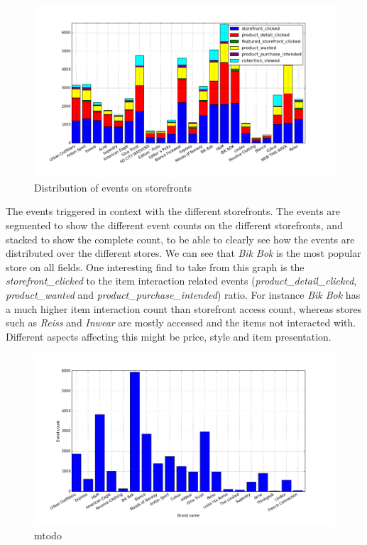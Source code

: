     \begin{figure}[H]
        \includegraphics[width=5in]{image/storefront_nameandEventdistribution.png}
        \centering
        \caption{Distribution of events on storefronts}
    \label{figure:eventOnStoreFrontDist}
    \end{figure}
        The events triggered in context with the different storefronts.
        The events are segmented to show the different event counts on the different storefronts, and stacked to show the complete count, to be able to clearly see how the events are distributed over the different stores.
        We can see that \emph{Bik Bok} is the most popular store on all fields.
        One interesting find to take from this graph is the \emph{storefront\_clicked} to the item interaction related events (\emph{product\_detail\_clicked}, \emph{product\_wanted} and \emph{product\_purchase\_intended}) ratio.
        For instance \emph{Bik Bok} has a much higher item interaction count than storefront access count, whereas stores such as \emph{Reiss} and \emph{Inwear} are mostly accessed and the items not interacted with.
        Different aspects affecting this might be price, style and item presentation.

    \begin{figure}[H]
        \includegraphics[width=5in]{image/retailer_branddistribution.png}
        \centering
        \caption{mtodo}
    \label{figure:retailerBDist}
    \end{figure}


